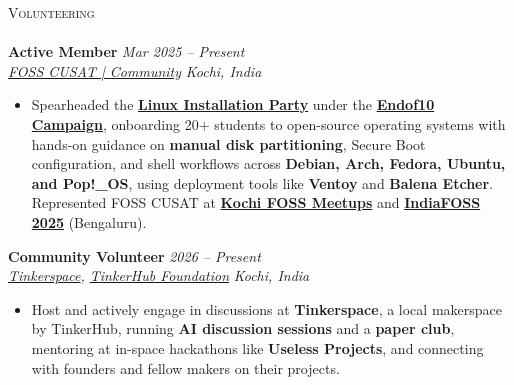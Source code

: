 \documentclass[a4paper]{article}
\newcommand{\lineunder} {
    \vspace*{-8pt} \\
    \hspace*{-18pt} \hrulefill \\
}
\newcommand{\header} [1] {
    {\hspace*{-18pt}\vspace*{6pt} \textsc{#1}}
    \vspace*{-6pt} \lineunder
}
\begin{document}
\header{Volunteering}
\textbf{Active Member} \hfill \textit{Mar 2025 -- Present} \\
\textit{\href{https://fossunited.org/c/school-of-engineering-cusat}{FOSS CUSAT | Community}} \hfill \textit{Kochi, India}
\begin{itemize}
    \item[] Spearheaded the \textbf{\href{https://www.linkedin.com/posts/aaromalonline_endof10-foss-activity-7418182178624126976-I1s4?}{Linux Installation Party}} under the \textbf{\href{https://endof10.org/}{Endof10 Campaign}}, onboarding 20+ students to open-source operating systems with hands-on guidance on \textbf{manual disk partitioning}, Secure Boot configuration, and shell workflows across \textbf{Debian, Arch, Fedora, Ubuntu, and Pop!\_OS}, using deployment tools like \textbf{Ventoy} and \textbf{Balena Etcher}. Represented FOSS CUSAT at \textbf{\href{https://kochifoss.org/}{Kochi FOSS Meetups}} and \textbf{\href{https://fossunited.org/indiafoss/2025}{IndiaFOSS 2025}} (Bengaluru).
\end{itemize}
\vspace*{2mm}

\textbf{Community Volunteer} \hfill \textit{2026 -- Present} \\
\textit{\href{https://tinkerhub.org/tinkerspace}{Tinkerspace}, \href{https://tinkerhub.org/}{TinkerHub Foundation}} \hfill \textit{Kochi, India}
\begin{itemize}
    \item[] Host and actively engage in discussions at \textbf{Tinkerspace}, a local makerspace by TinkerHub, running \textbf{AI discussion sessions} and a \textbf{paper club}, mentoring at in-space hackathons like \textbf{Useless Projects}, and connecting with founders and fellow makers on their projects.
\end{itemize}
\vspace*{3mm}
\end{document}
